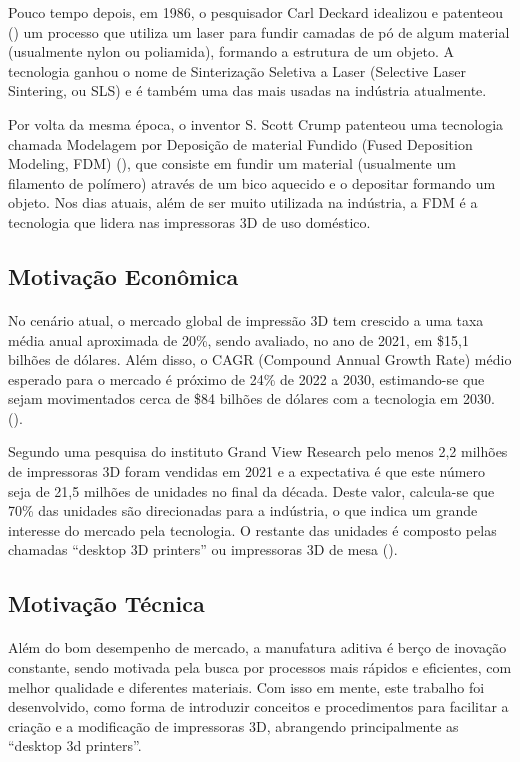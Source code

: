 \documentclass[12pt, english]{article}
\begin{document}
Pouco tempo depois, em 1986, o pesquisador Carl Deckard idealizou e patenteou (\cite{Deckard1986}) um processo que utiliza um laser para fundir camadas de pó de algum material (usualmente nylon ou poliamida), formando a estrutura de um objeto. A tecnologia ganhou o nome de Sinterização Seletiva a Laser (Selective Laser Sintering, ou SLS) e é também uma das mais usadas na indústria atualmente.

Por volta da mesma época, o inventor S. Scott Crump patenteou uma tecnologia chamada Modelagem por Deposição de material Fundido (Fused Deposition Modeling, FDM) (\cite{Crump1989}), que consiste em fundir um material (usualmente um filamento de polímero) através de um bico aquecido e o depositar formando um objeto. Nos dias atuais, além de ser muito utilizada na indústria, a FDM é a tecnologia que lidera nas impressoras 3D de uso doméstico.

\subsection{Motivação Econômica}

\paragraph{}
No cenário atual, o mercado global de impressão 3D tem crescido a uma taxa média anual aproximada de 20\%, sendo avaliado, no ano de 2021, em \$15,1  bilhões de dólares. Além disso, o CAGR (Compound Annual Growth Rate) médio esperado para o mercado é próximo de 24\% de 2022 a 2030, estimando-se que sejam movimentados cerca de \$84 bilhões de dólares com a tecnologia em 2030. (\cite{Fortune}).

Segundo uma pesquisa do instituto Grand View Research pelo menos 2,2 milhões de impressoras 3D foram vendidas em 2021 e a expectativa é que este número seja de 21,5 milhões de unidades no final da década. Deste valor, calcula-se que 70\% das unidades são direcionadas para a indústria, o que indica um grande interesse do mercado pela tecnologia. O restante das unidades é composto pelas chamadas “desktop 3D printers” ou impressoras 3D de mesa (\cite{GRV2022}).

\subsection{Motivação Técnica}

\paragraph{}
Além do bom desempenho de mercado, a manufatura aditiva é berço de inovação constante, sendo motivada pela busca por processos mais rápidos e eficientes, com melhor qualidade e diferentes materiais. Com isso em mente, este trabalho foi desenvolvido, como forma de introduzir conceitos e procedimentos para facilitar a criação e a modificação de impressoras 3D, abrangendo principalmente as “desktop 3d printers”.
\end{document}
